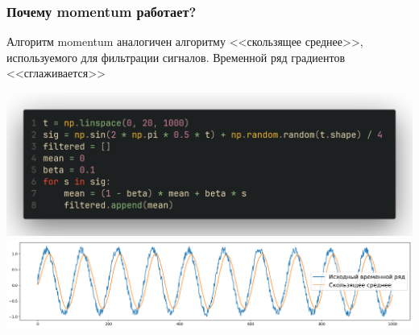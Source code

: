 \documentclass[9pt]{beamer}
\begin{document}
\begin{frame}
    \frametitle{Почему momentum работает?}
    Алгоритм momentum аналогичен алгоритму <<скользящее среднее>>, используемого для фильтрации сигналов.
    Временной ряд градиентов <<сглаживается>>
    \begin{center}
        \includegraphics[width = 1\textwidth]{code_smoving_avarage.png}
        \includegraphics[width = 1 \textwidth]{moving_avarage.png}
    \end{center}
\end{frame}
\end{document}
